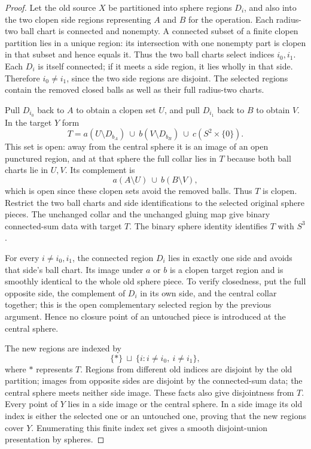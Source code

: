 \begin{proof}
Let the old source $X$ be partitioned into sphere regions $D_i$, and
also into the two clopen side regions representing $A$ and $B$ for
the operation.  Each radius-two ball chart is connected and nonempty.
A connected subset of a finite clopen partition lies in a unique
region: its intersection with one nonempty part is clopen in that
subset and hence equals it.  Thus the two ball charts select indices
$i_0,i_1$.  Each $D_i$ is itself connected; if it meets a side region,
it lies wholly in that side.  Therefore $i_0\ne i_1$, since the two
side regions are disjoint.  The selected regions contain the removed
closed balls as well as their full radius-two charts.

Pull $D_{i_0}$ back to $A$ to obtain a clopen set $U$, and pull
$D_{i_1}$ back to $B$ to obtain $V$.  In the target $Y$ form
\[
 T=a(U\setminus D_{b_A})\ \cup\
       b(V\setminus D_{b_B})\ \cup\ c(S^2\times\{0\}).
\]
This set is open: away from the central sphere it is an image of an
open punctured region, and at that sphere the full collar lies in $T$
because both ball charts lie in $U,V$.  Its complement is
\[
       a(A\setminus U)\ \cup\ b(B\setminus V),
\]
which is open since these clopen sets avoid the removed balls.
Thus $T$ is clopen.  Restrict the two ball charts and side
identifications to the selected original sphere pieces.  The
unchanged collar and the unchanged gluing map give binary
connected-sum data with target $T$.  The binary sphere identity
identifies $T$ with $S^3$.

For every $i\ne i_0,i_1$, the connected region $D_i$ lies in exactly
one side and avoids that side's ball chart.  Its image under $a$ or
$b$ is a clopen target region and is smoothly identical to the whole
old sphere piece.  To verify closedness, put the full opposite side,
the complement of $D_i$ in its own side, and the central collar
together; this is the open complementary selected region by the
previous argument.  Hence no closure point of an untouched piece
is introduced at the central sphere.

The new regions are indexed by
\[
       \{*\}\ \sqcup\ \{i:i\ne i_0,\ i\ne i_1\},
\]
where $*$ represents $T$.  Regions from different old indices are
disjoint by the old partition; images from opposite sides are
disjoint by the connected-sum data; the central sphere meets
neither side image.  These facts also give disjointness from $T$.
Every point of $Y$ lies in a side image or the central sphere.
In a side image its old index is either the selected one or an
untouched one, proving that the new regions cover $Y$.
Enumerating this finite index set gives a smooth disjoint-union
presentation by spheres.
\end{proof}

